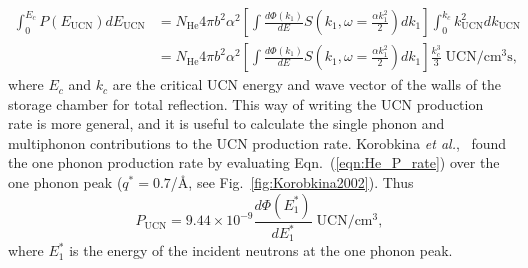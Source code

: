 \begin{equation}
\label{eqn:He_P_rate}
\begin{split}
\int _0 ^{E_c} P(E_{\text{UCN}})dE_{\text{UCN}} &= N_{\text{He}} 4 \pi b^2
\alpha^2 \left[ \int \frac{d\Phi(k_1)}{dE} S \left( k_1,
  \omega=\frac{\alpha k_1^2}{2} \right)dk_1 \right] \int_0^{k_c}
k_{\text{UCN}}^2dk_{\text{UCN}} \\ &=N_{\text{He}} 4 \pi b^2 \alpha^2 \left[
  \int \frac{d\Phi(k_1)}{dE} S \left( k_1, \omega=\frac{\alpha
    k_1^2}{2} \right) dk_1 \right] \frac{k_c^3}{3}\;
\text{UCN}/\text{cm}^3 \text{s},
\end{split}
\end{equation}
where $E_c$ and $k_c$ are the critical UCN energy and wave vector of
the walls of the storage chamber for total reflection. This way of
writing the UCN production rate is more general, and it is useful to
calculate the single phonon and multiphonon contributions to the UCN
production rate. Korobkina {\it{et al.}},~\cite{Korobkina2002} found
the one phonon production rate by evaluating
Eqn.~(\ref{eqn:He_P_rate}) over the one phonon peak ($q^*=0.7$/\AA,
see Fig.~\ref{fig:Korobkina2002}).  Thus
\begin{equation}
P_{\text{UCN}}=9.44 \times 10^{-9}\frac{d\Phi (E_1^*)}{dE_1^*} \;
\text{UCN}/\text{cm}^3,
\end{equation}
 where $E_1^*$ is the energy of the incident neutrons at the one phonon peak.






